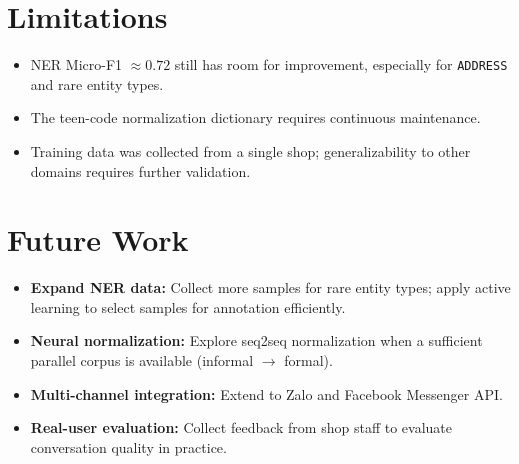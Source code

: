 \documentclass[12pt, a4paper]{report}
\begin{document}
\section*{Limitations}

\begin{itemize}
  \item NER Micro-F1 $\approx 0.72$ still has room for improvement,
        especially for \texttt{ADDRESS} and rare entity types.
  \item The teen-code normalization dictionary requires continuous maintenance.
  \item Training data was collected from a single shop;
        generalizability to other domains requires further validation.
\end{itemize}

\section*{Future Work}

\begin{itemize}
  \item \textbf{Expand NER data:} Collect more samples for rare entity types;
        apply active learning to select samples for annotation efficiently.
  \item \textbf{Neural normalization:} Explore seq2seq normalization
        when a sufficient parallel corpus is available (informal $\rightarrow$ formal).
  \item \textbf{Multi-channel integration:} Extend to Zalo and Facebook Messenger API.
  \item \textbf{Real-user evaluation:} Collect feedback from shop staff
        to evaluate conversation quality in practice.
\end{itemize}
\end{document}
